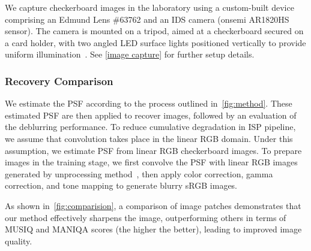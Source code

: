 We capture checkerboard images in the laboratory using a custom-built device comprising an Edmund Lens \#63762 and an IDS camera (onsemi AR1820HS sensor). The camera is mounted on a tripod, aimed at a checkerboard secured on a card holder, with two angled LED surface lights positioned vertically to provide uniform illumination~\cite{ISO12233-2014}. See \cref{image capture} for further setup details.



\subsubsection{Recovery Comparison}
We estimate the PSF according to the process outlined in~\cref{fig:method}. These estimated PSF are then applied to recover images, followed by an evaluation of the deblurring performance. To reduce cumulative degradation in ISP pipeline, we assume that convolution takes place in the linear RGB domain. Under this assumption, we estimate PSF from linear RGB checkerboard images. To prepare images in the training stage, we first convolve the PSF with linear RGB images generated by unprocessing method~\cite{brooks2019unprocessing},  then apply color correction, gamma correction, and tone mapping to generate blurry sRGB images.

As shown in~\cref{fig:comparision}, a comparison of image patches demonstrates that our method effectively sharpens the image, outperforming others in terms of MUSIQ and MANIQA scores (the higher the better), leading to improved image quality. 





